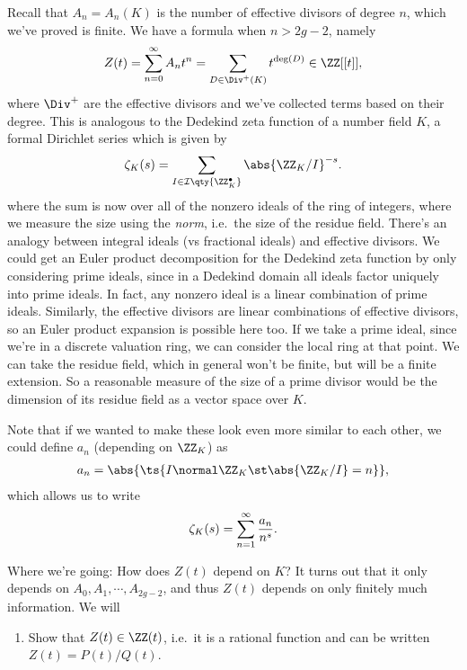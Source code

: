 Recall that \(A_n = A_n(K)\) is the number of effective divisors of
degree \(n\), which we've proved is finite. We have a formula when
\(n> 2g-2\), namely
\begin{align*}  
Z(t) = \sum_{n=0}^\infty A_n t^n = \sum_{D\in \Div^+(K)} t^{\deg(D)} \in \ZZ[[t]]
,\end{align*} where \(\Div^+\) are the effective divisors and we've
collected terms based on their degree. This is analogous to the Dedekind
zeta function of a number field \(K\), a formal Dirichlet series which
is given by
\begin{align*}  
\zeta_K(s) = \sum_{I \in \mathcal{I}\qty{\ZZ_K^\bullet}} \abs{ \ZZ_K / I}^{-s}
.\end{align*} where the sum is now over all of the nonzero ideals of the
ring of integers, where we measure the size using the \emph{norm},
i.e.~the size of the residue field. There's an analogy between integral
ideals (vs fractional ideals) and effective divisors. We could get an
Euler product decomposition for the Dedekind zeta function by only
considering prime ideals, since in a Dedekind domain all ideals factor
uniquely into prime ideals. In fact, any nonzero ideal is a linear
combination of prime ideals. Similarly, the effective divisors are
linear combinations of effective divisors, so an Euler product expansion
is possible here too. If we take a prime ideal, since we're in a
discrete valuation ring, we can consider the local ring at that point.
We can take the residue field, which in general won't be finite, but
will be a finite extension. So a reasonable measure of the size of a
prime divisor would be the dimension of its residue field as a vector
space over \(K\).

Note that if we wanted to make these look even more similar to each
other, we could define \(a_n\) (depending on \(\ZZ_K\)) as
\begin{align*}
a_n = \abs{\ts{I \normal \ZZ_K \st \abs{\ZZ_K/I} = n}}
,\end{align*} which allows us to write
\begin{align*}  
\zeta_K(s) = \sum_{n=1}^\infty {a_n \over n^s}
.\end{align*}

Where we're going: How does \(Z(t)\) depend on \(K\)? It turns out that
it only depends on \(A_0, A_1, \cdots, A_{2g-2}\), and thus \(Z(t)\)
depends on only finitely much information. We will

\begin{enumerate}
\def\labelenumi{\arabic{enumi}.}
\tightlist
\item
  Show that \(Z(t) \in \ZZ(t)\), i.e.~it is a rational function and can
  be written \(Z(t) = P(t)/ Q(t)\).
\end{enumerate}


